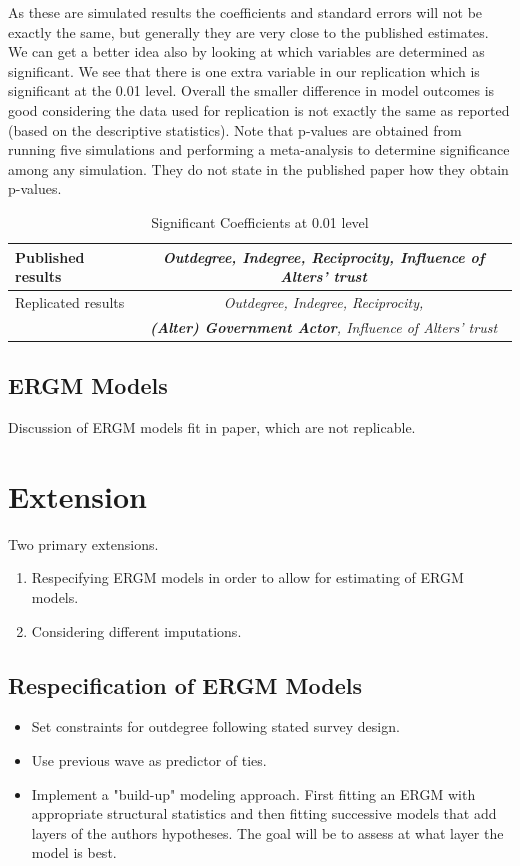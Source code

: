 \documentclass[12pt]{article} %
\numberwithin{equation}{section}		%
\numberwithin{figure}{section}			%
\numberwithin{table}{section}				%
\begin{document}
As these are simulated results the coefficients and standard errors will not be exactly the same, but generally they are very close to the published estimates. We can get a better idea also by looking at which variables are determined as significant. We see that there is one extra variable in our replication which is significant at the 0.01 level. Overall the smaller difference in model outcomes is good considering the data used for replication is not exactly the same as reported (based on the descriptive statistics). Note that p-values are obtained from running five simulations and performing a meta-analysis to determine significance among any simulation. They do not state in the published paper how they obtain p-values.

\begin{table}[!ht]
 	   \caption{\label{tab06} Significant Coefficients at 0.01 level}
 	\centering
 	\begin{tabular}{lc}
 		\hline
 		Published results & \textit{Outdegree, Indegree, Reciprocity, Influence of Alters' trust} \\ 	
 		\hline
 		\hline
 		Replicated results & \textit{Outdegree, Indegree, Reciprocity,} \\
 		& \textit{\textbf{(Alter) Government Actor}, Influence of Alters' trust} \\
 		\hline
 	\end{tabular}
\end{table}

\subsection{ERGM Models}
Discussion of ERGM models fit in paper, which are not replicable.

\section{Extension}
Two primary extensions.

\begin{enumerate}
\item Respecifying ERGM models in order to allow for estimating of ERGM models.
\item Considering different imputations.
\end{enumerate}

\subsection{Respecification of ERGM Models}
\begin{itemize}
\item Set constraints for outdegree following stated survey design.
\item Use previous wave as predictor of ties.
\item Implement a "build-up" modeling approach. First fitting an ERGM with appropriate structural statistics and then fitting successive models that add layers of the authors hypotheses. The goal will be to assess at what layer the model is best.
\end{itemize}
\end{document}
